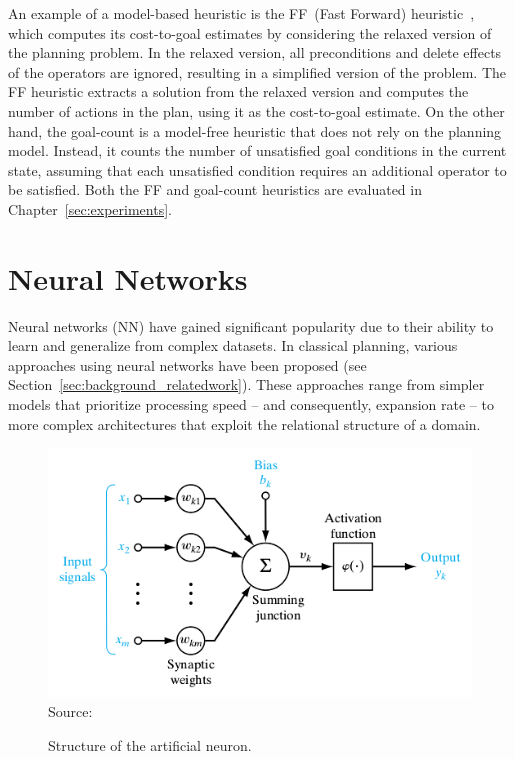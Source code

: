 An example of a model-based heuristic is the FF~(Fast Forward) heuristic~\cite{Hoffmann.Nebel/2001}, which computes its cost-to-goal estimates by considering the relaxed version of the planning problem. In the relaxed version, all preconditions and delete effects of the operators are ignored, resulting in a simplified version of the problem. The FF heuristic extracts a solution from the relaxed version and computes the number of actions in the plan, using it as the cost-to-goal estimate. On the other hand, the goal-count is a model-free heuristic that does not rely on the planning model. Instead, it counts the number of unsatisfied goal conditions in the current state, assuming that each unsatisfied condition requires an additional operator to be satisfied. Both the FF and goal-count heuristics are evaluated in Chapter~\ref{sec:experiments}.

\section{Neural Networks}
\label{sec:background_neuralnetworks}

Neural networks (NN) have gained significant popularity due to their ability to learn and generalize from complex datasets. In classical planning, various approaches using neural networks have been proposed (see Section~\ref{sec:background_relatedwork}). These approaches range from simpler models that prioritize processing speed -- and consequently, expansion rate -- to more complex architectures that exploit the relational structure of a domain.

\begin{figure}[ht]
    \caption{Structure of the artificial neuron.}
    \label{fig:neuron}
    \centering
    \includegraphics[width=0.9\linewidth]{figures/neuron.png} \\
    Source:~\cite{Haykin/2009}
\end{figure}

